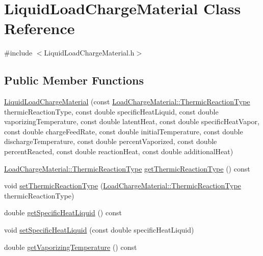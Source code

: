 \hypertarget{class_liquid_load_charge_material}{}\section{Liquid\+Load\+Charge\+Material Class Reference}
\label{class_liquid_load_charge_material}


{\ttfamily \#include $<$Liquid\+Load\+Charge\+Material.\+h$>$}

\subsection*{Public Member Functions}
\begin{DoxyCompactItemize}
\item 
\hyperlink{class_liquid_load_charge_material_ab6b2ef342701227c60dc380f5a576085}{Liquid\+Load\+Charge\+Material} (const \hyperlink{namespace_load_charge_material_a51d4263e865a5d86236622dd3fe23fd1}{Load\+Charge\+Material\+::\+Thermic\+Reaction\+Type} thermic\+Reaction\+Type, const double specific\+Heat\+Liquid, const double vaporizing\+Temperature, const double latent\+Heat, const double specific\+Heat\+Vapor, const double charge\+Feed\+Rate, const double initial\+Temperature, const double discharge\+Temperature, const double percent\+Vaporized, const double percent\+Reacted, const double reaction\+Heat, const double additional\+Heat)
\item 
\hyperlink{namespace_load_charge_material_a51d4263e865a5d86236622dd3fe23fd1}{Load\+Charge\+Material\+::\+Thermic\+Reaction\+Type} \hyperlink{class_liquid_load_charge_material_a181337f5e5cf6a47b82dd56897b49c29}{get\+Thermic\+Reaction\+Type} () const
\item 
void \hyperlink{class_liquid_load_charge_material_a39c258d0bfdcfa352590d411a8c4e882}{set\+Thermic\+Reaction\+Type} (\hyperlink{namespace_load_charge_material_a51d4263e865a5d86236622dd3fe23fd1}{Load\+Charge\+Material\+::\+Thermic\+Reaction\+Type} thermic\+Reaction\+Type)
\item 
double \hyperlink{class_liquid_load_charge_material_aa698f1f73dff91951139a4a50582963d}{get\+Specific\+Heat\+Liquid} () const
\item 
void \hyperlink{class_liquid_load_charge_material_a2187c4c6ba394c05ab42e769bf175683}{set\+Specific\+Heat\+Liquid} (const double specific\+Heat\+Liquid)
\item 
double \hyperlink{class_liquid_load_charge_material_a07004e345fb4ff287d435d0c84027973}{get\+Vaporizing\+Temperature} () const

\end{DoxyCompactItemize}
